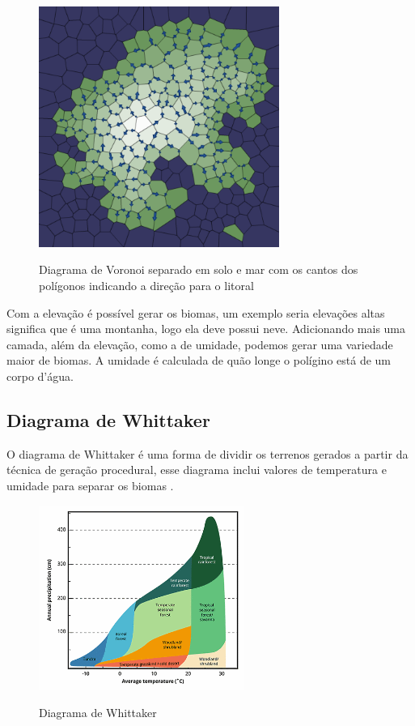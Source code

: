 \begin{figure}[H]
	\caption{Diagrama de Voronoi separado em solo e mar com os cantos dos polígonos indicando a direção para o litoral}
	\centering
	\includegraphics[width=0.7\textwidth]{figures/downslopes.png}
	\label{fig:downslopes}
\end{figure}

Com a elevação é possível gerar os biomas, um exemplo seria elevações altas significa que é uma montanha, logo ela deve possui neve. Adicionando mais uma camada, além da elevação, como a de umidade, podemos gerar uma variedade maior de biomas. A umidade é calculada de quão longe o polígino está de um corpo d'água.

\subsection*{Diagrama de Whittaker}

O diagrama de Whittaker é uma forma de dividir os terrenos gerados a partir da técnica de geração procedural, esse diagrama inclui valores de temperatura e umidade para separar os biomas \cite{wikidotwhittakerdiagram}.

\begin{figure}[H]
	\caption{Diagrama de Whittaker}
	\centering
	\includegraphics[width=0.6\textwidth]{figures/diagrama-whittaker.png}
	\label{fig:diagrama-whittaker}
\end{figure}

